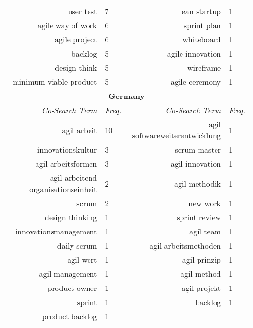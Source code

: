 \begin{spacing}{.65}
\begin{table}[!htbp]
{\begin{tabular}{rlrl}
user test              & 7  & lean startup                  & 1 \\
agile way of work      & 6  & sprint plan                   & 1 \\
agile project          & 6  & whiteboard                    & 1 \\
backlog                & 5  & agile innovation              & 1 \\
design think           & 5  & wireframe                     & 1 \\
minimum viable product & 5  & agile ceremony                & 1 \\




\multicolumn{4}{c}{\textbf{Germany}}                                                                   \\
\textit{Co-Search Term}             & \textit{Freq.} & \textit{Co-Search Term}        & \textit{Freq.} \\ \hline
agil arbeit                         & 10             & agil softwareweiterentwicklung & 1              \\
innovationskultur                   & 3              & scrum master                   & 1              \\
agil arbeitsformen                  & 3              & agil innovation                & 1              \\
agil arbeitend organisationseinheit & 2              & agil methodik                  & 1              \\
scrum                               & 2              & new work                       & 1              \\
design thinking                     & 1              & sprint review                  & 1              \\
innovationsmanagement               & 1              & agil team                      & 1              \\
daily scrum                         & 1              & agil arbeitsmethoden           & 1              \\
agil wert                           & 1              & agil prinzip                   & 1              \\
agil management                     & 1              & agil method                    & 1              \\
product owner                       & 1              & agil projekt                   & 1              \\
sprint                              & 1              & backlog                        & 1              \\
product backlog                     & 1              &                                &               
\end{tabular}%
}
\end{table}
\end{spacing}
\endgroup
